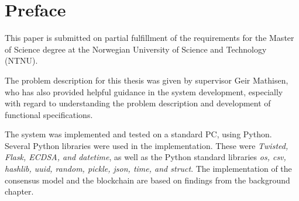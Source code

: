 \chapter*{Preface}
This paper is submitted on partial fulfillment of the requirements for the Master of Science degree at the Norwegian University of Science and Technology (NTNU).

The problem description for this thesis was given by supervisor Geir Mathisen, who has also provided helpful guidance in the system development, especially with regard to understanding the problem description and development of functional specifications.

The system was implemented and tested on a standard PC, using Python. Several Python libraries were used in the implementation. These were \textit{Twisted, Flask, ECDSA, and datetime}, as well as the Python standard libraries \textit{os, csv, hashlib, uuid, random, pickle, json, time, and struct}. The implementation of the consensus model and the blockchain are based on findings from the background chapter.


